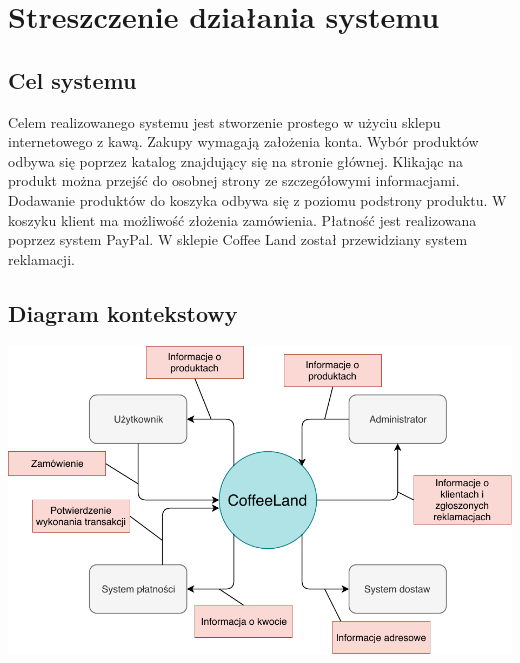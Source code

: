 \documentclass[12pt]{report}
\begin{document}
	
	
	\newpage
	
	\tableofcontents 
	
	\setcounter{chapter}{0}	
	\setcounter{section}{0}	
	
	
	
	\chapter{Streszczenie działania systemu}
	
		\section{Cel systemu}
	
		Celem realizowanego systemu jest stworzenie prostego w użyciu sklepu internetowego z kawą. Zakupy wymagają założenia konta. Wybór produktów odbywa się poprzez katalog znajdujący się na stronie głównej. Klikając na produkt można przejść do osobnej strony ze szczegółowymi informacjami. Dodawanie produktów do koszyka odbywa się z poziomu podstrony produktu. W koszyku klient ma możliwość złożenia zamówienia. Płatność jest realizowana poprzez system PayPal. W sklepie Coffee Land został przewidziany system reklamacji.
	
		\section{Diagram kontekstowy}
			\begin{center}
				\includegraphics[width=400pt]{kontekstowy.pdf}
			\end{center}
	
\end{document}
